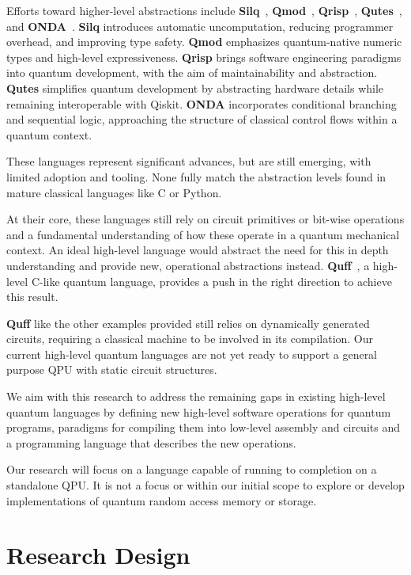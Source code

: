 \documentclass[journal,onecolumn, compsoc]{IEEEtran}
\begin{document}
Efforts toward higher-level abstractions include \textbf{Silq}~\cite{silq2024}, \textbf{Qmod}~\cite{qmod2025}, \textbf{Qrisp}~\cite{qrisp2024}, \textbf{Qutes}~\cite{qutes2025}, and \textbf{ONDA}~\cite{onda2024}. \textbf{Silq} introduces automatic uncomputation, reducing programmer overhead, and improving type safety. \textbf{Qmod} emphasizes quantum-native numeric types and high-level expressiveness. \textbf{Qrisp} brings software engineering paradigms into quantum development, with the aim of maintainability and abstraction. \textbf{Qutes} simplifies quantum development by abstracting hardware details while remaining interoperable with Qiskit. \textbf{ONDA} incorporates conditional branching and sequential logic, approaching the structure of classical control flows within a quantum context.

These languages represent significant advances, but are still emerging, with limited adoption and tooling. None fully match the abstraction levels found in mature classical languages like C or Python.

At their core, these languages still rely on circuit primitives or bit-wise operations and a fundamental understanding of how these operate in a quantum mechanical context.
An ideal high-level language would abstract the need for this in depth understanding and provide new, operational abstractions instead.
\textbf{Quff}~\cite{quff2024}, a high-level C-like quantum language, provides a push in the right direction to achieve this result. 

\textbf{Quff} like the other examples provided still relies on dynamically generated circuits, requiring a classical machine to be involved in its compilation.
Our current high-level quantum languages are not yet ready to support a general purpose QPU with static circuit structures.

We aim with this research to address the remaining gaps in existing high-level quantum languages by defining new high-level software operations for quantum programs, paradigms for compiling them into low-level assembly and circuits and a programming language that describes the new operations.

Our research will focus on a language capable of running to completion on a standalone QPU. 
It is not a focus or within our initial scope to explore or develop implementations of quantum random access memory or storage.

\section{Research Design}
\end{document}
